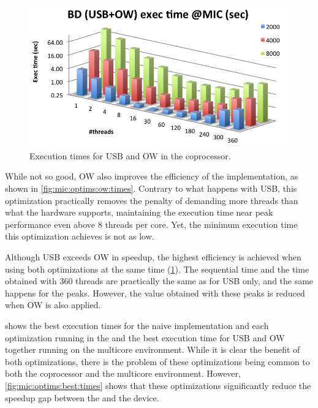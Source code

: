 \documentclass[../thesis]{subfiles}
\begin{document}
	\begin{figure}[p]
		\centering
		\includegraphics[height=0.25\textheight]{assets/images/mic/optims/mic-usbow-times.png}
		\caption{Execution times for USB and OW in the \intel\xeonphi coprocessor.}
		\label{fig:mic:optims:usbow:times}
	\end{figure}

	While not so good, OW also improves the efficiency of the implementation, as shown in \cref{fig:mic:optims:ow:times}. Contrary to what happens with USB, this optimization practically removes the penalty of demanding more threads than what the hardware supports, maintaining the execution time near peak performance even above 8 threads per core. Yet, the minimum execution time this optimization achieves is not as low.

	Although USB exceeds OW in speedup, the highest efficiency is achieved when using both optimizations at the same time (\cref{fig:mic:optims:usbow:times}). The sequential time and the time obtained with 360 threads are practically the same as for USB only, and the same happens for the peaks. However, the value obtained with these peaks is reduced when OW is also applied.

	 shows the best execution times for the naive implementation and each optimization running in the \intel\xeonphi and the best execution time for USB and OW together running on the multicore environment. While it is clear the benefit of both optimizations, there is the problem of these optimizations being common to both the coprocessor and the multicore environment. However, \cref{fig:mic:optims:best:times} shows that these optimizations significantly reduce the speedup gap between the \cpu and the device.
\end{document}
